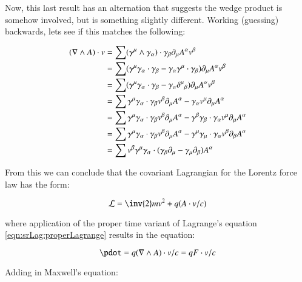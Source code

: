 Now, this last result has an alternation that suggests the wedge product is somehow involved, but is something slightly different.  Working (guessing) backwards, lets
see if this matches the following:

\begin{align*}
(\nabla \wedge A) \cdot v
&= \sum ( \gamma^{\mu} \wedge \gamma_{\alpha} ) \cdot \gamma_{\beta} \partial_{\mu} A^{\alpha} v^{\beta} \\
&= \sum (\gamma^{\mu} \gamma_{\alpha} \cdot \gamma_{\beta} - \gamma_{\alpha} \gamma^{\mu} \cdot \gamma_{\beta}) \partial_{\mu} A^{\alpha} v^{\beta} \\
&= \sum (\gamma^{\mu} \gamma_{\alpha} \cdot \gamma_{\beta} - \gamma_{\alpha} {\delta^{\mu}}_{\beta}) \partial_{\mu} A^{\alpha} v^{\beta} \\
&= \sum 
 \gamma^{\mu} \gamma_{\alpha} \cdot \gamma_{\beta} v^{\beta} \partial_{\mu} A^{\alpha}
-\gamma_{\alpha} v^{\mu} \partial_{\mu} A^{\alpha} \\
&= \sum 
 \gamma^{\mu} \gamma_{\alpha} \cdot \gamma_{\beta} v^{\beta} \partial_{\mu} A^{\alpha}
-
\gamma^{\beta} \gamma_{\beta} \cdot \gamma_{\alpha}
 v^{\mu} \partial_{\mu} A^{\alpha} \\
&= \sum 
 \gamma^{\mu} \gamma_{\alpha} \cdot \gamma_{\beta} v^{\beta} \partial_{\mu} A^{\alpha}
-
\gamma^{\mu} \gamma_{\mu} \cdot \gamma_{\alpha} v^{\beta} \partial_{\beta} A^{\alpha} \\
&= \sum v^{\beta} \gamma^{\mu} \gamma_{\alpha} \cdot ( \gamma_{\beta} \partial_{\mu} - \gamma_{\mu} \partial_{\beta} ) A^{\alpha} \\ 
\end{align*}

From this we can conclude that the covariant Lagrangian for the Lorentz force law has the form:

\begin{equation}\label{eqn:srLag:lorentzLagrange}
\mathcal{L} = \inv{2}m v^2 + q (A \cdot v/c)
\end{equation}

where application of the proper time variant of Lagrange's equation \ref{eqn:srLag:properLagrange} results in the equation:

\begin{equation}
\pdot = q (\grad \wedge A) \cdot v/c = q F \cdot v/c
\end{equation}

Adding in Maxwell's equation:

